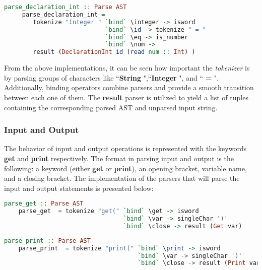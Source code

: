 \documentclass[a4paper, onecolumn]{article}
\begin{document}
    \begin{tcolorbox}
    \begin{lstlisting}[language=Haskell] 
     parse_declaration_int :: Parse AST 
     parse_declaration_int = 
        tokenize "Integer " `bind` \integer -> isword 
                            `bind` \id -> tokenize " = " 
                            `bind` \eq -> is_number 
                            `bind` \num ->
        result (DeclarationInt id (read num :: Int) ) 
     \end{lstlisting}
    \end{tcolorbox}
    
    \noindent From the above implementations, it can be seen how important the \textit{tokenizer} is by parsing groups of characters like ``\textbf{String }",``\textbf{Integer }", and ``\textbf{ = }". Additionally, binding operators combine parsers and provide a smooth transition between each one of them. The \textbf{result} parser is utilized to yield a list of tuples containing the corresponding parsed AST and unparsed input string.  
    
    
    \subsubsection{Input and Output}
    
    The behavior of input and output operations is represented with the keywords \textbf{get} and \textbf{print} respectively. The format in parsing input and output is the following: a keyword (either \textbf{get} or \textbf{print}), an opening bracket, variable name, and a closing bracket. The implementation of the parsers that will parse the input and output statements is presented below:
    
    \begin{tcolorbox}
    \begin{lstlisting}[language=Haskell] 
    parse_get :: Parse AST
    parse_get  = tokenize "get(" `bind` \get -> isword 
                                 `bind` \var -> singleChar ')' 
                                 `bind` \close -> result (Get var) 
     \end{lstlisting}
    \end{tcolorbox}
    
    \begin{tcolorbox}
    \begin{lstlisting}[language=Haskell] 
    parse_print :: Parse AST
    parse_print  = tokenize "print(" `bind` \print -> isword 
                                     `bind` \var -> singleChar ')' 
                                     `bind` \close -> result (Print var) 
     \end{lstlisting}
    \end{tcolorbox}
    
\end{document}
